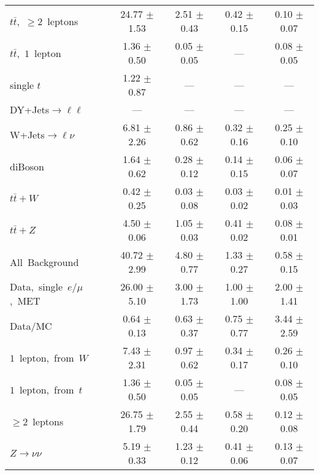 \documentclass{article}
\begin{document}
\begin{longtable}{|l|c|c|c|c|}
$t\bar{t}$,~$\ge2$~leptons & 24.77 $\pm$ 1.53  & 2.51 $\pm$ 0.43  & 0.42 $\pm$ 0.15  & 0.10 $\pm$ 0.07 \\* 
$t\bar{t}$,~$1$~lepton & 1.36 $\pm$ 0.50  & 0.05 $\pm$ 0.05  & ---  & 0.08 $\pm$ 0.05 \\* 
single $t$  & 1.22 $\pm$ 0.87  & ---  & ---  & --- \\* 
DY+Jets$\rightarrow\ell\ell$  & ---  & ---  & ---  & --- \\* 
W+Jets$\rightarrow\ell\nu$  & 6.81 $\pm$ 2.26  & 0.86 $\pm$ 0.62  & 0.32 $\pm$ 0.16  & 0.25 $\pm$ 0.10 \\* 
diBoson  & 1.64 $\pm$ 0.62  & 0.28 $\pm$ 0.12  & 0.14 $\pm$ 0.15  & 0.06 $\pm$ 0.07 \\* 
$t\bar{t}+W$  & 0.42 $\pm$ 0.25  & 0.03 $\pm$ 0.08  & 0.03 $\pm$ 0.02  & 0.01 $\pm$ 0.03 \\* 
$t\bar{t}+Z$  & 4.50 $\pm$ 0.06  & 1.05 $\pm$ 0.03  & 0.41 $\pm$ 0.02  & 0.08 $\pm$ 0.01 \\* 
\hline \hline 
All~Background  & 40.72 $\pm$ 2.99  & 4.80 $\pm$ 0.77  & 1.33 $\pm$ 0.27  & 0.58 $\pm$ 0.15 \\* 
Data,~single~$e/\mu$,~MET  & 26.00 $\pm$ 5.10  & 3.00 $\pm$ 1.73  & 1.00 $\pm$ 1.00  & 2.00 $\pm$ 1.41 \\* 
Data/MC  & 0.64 $\pm$ 0.13  & 0.63 $\pm$ 0.37  & 0.75 $\pm$ 0.77  & 3.44 $\pm$ 2.59 \\* 
\hline \hline 
$1$~lepton,~from~$W$  & 7.43 $\pm$ 2.31  & 0.97 $\pm$ 0.62  & 0.34 $\pm$ 0.17  & 0.26 $\pm$ 0.10 \\* 
$1$~lepton,~from~$t$  & 1.36 $\pm$ 0.50  & 0.05 $\pm$ 0.05  & ---  & 0.08 $\pm$ 0.05 \\* 
$\ge2$~leptons  & 26.75 $\pm$ 1.79  & 2.55 $\pm$ 0.44  & 0.58 $\pm$ 0.20  & 0.12 $\pm$ 0.08 \\* 
$Z\rightarrow\nu\nu$  & 5.19 $\pm$ 0.33  & 1.23 $\pm$ 0.12  & 0.41 $\pm$ 0.06  & 0.13 $\pm$ 0.07 \\* 
\hline 
\end{longtable} 

 
 
 
 
\pagebreak 

 
 
 
 
\end{document}
